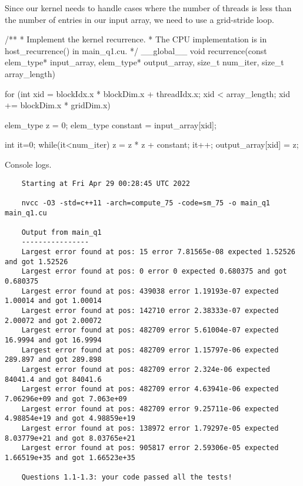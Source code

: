 \documentclass[12pt,letterpaper,twoside]{article}
\begin{document}
\begin{itemize}
    Since our kernel needs to handle cases where the number of threads is less 
    than the number of entries in our input array, we need to use a grid-stride 
    loop.

    \begin{cpp}
    /**
    * Implement the kernel recurrence.
    * The CPU implementation is in host_recurrence() in main_q1.cu.
    */
    __global__ void recurrence(const elem_type* input_array,
                               elem_type* output_array, 
                               size_t num_iter,
                               size_t array_length) {

        for (int xid = blockIdx.x * blockDim.x + threadIdx.x;
            xid < array_length;
            xid += blockDim.x * gridDim.x) {
        
            elem_type z = 0;
            elem_type constant = input_array[xid];

            int it=0;
            while(it<num_iter) {
            z = z * z + constant;
            it++;
            }
            output_array[xid] = z;
        }
    }
    \end{cpp}
    
    Console logs.
    \begin{verbatim}
    Starting at Fri Apr 29 00:28:45 UTC 2022

    nvcc -O3 -std=c++11 -arch=compute_75 -code=sm_75 -o main_q1 main_q1.cu

    Output from main_q1
    ----------------
    Largest error found at pos: 15 error 7.81565e-08 expected 1.52526 and got 1.52526
    Largest error found at pos: 0 error 0 expected 0.680375 and got 0.680375
    Largest error found at pos: 439038 error 1.19193e-07 expected 1.00014 and got 1.00014
    Largest error found at pos: 142710 error 2.38333e-07 expected 2.00072 and got 2.00072
    Largest error found at pos: 482709 error 5.61004e-07 expected 16.9994 and got 16.9994
    Largest error found at pos: 482709 error 1.15797e-06 expected 289.897 and got 289.898
    Largest error found at pos: 482709 error 2.324e-06 expected 84041.4 and got 84041.6
    Largest error found at pos: 482709 error 4.63941e-06 expected 7.06296e+09 and got 7.063e+09
    Largest error found at pos: 482709 error 9.25711e-06 expected 4.98854e+19 and got 4.98859e+19
    Largest error found at pos: 138972 error 1.79297e-05 expected 8.03779e+21 and got 8.03765e+21
    Largest error found at pos: 905817 error 2.59306e-05 expected 1.66519e+35 and got 1.66523e+35

    Questions 1.1-1.3: your code passed all the tests!


\end{verbatim}
\end{itemize}
\end{document}
